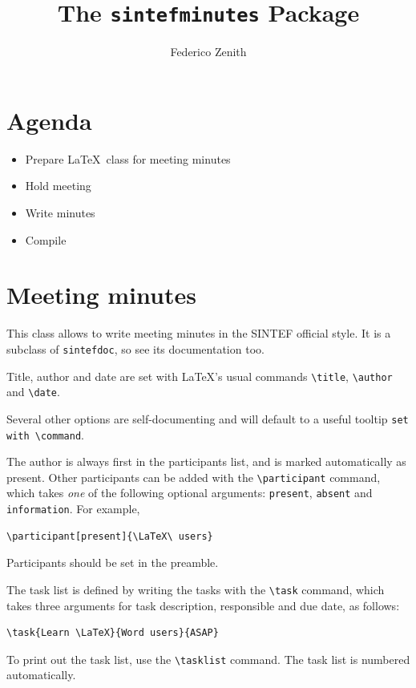 \documentclass[unrestricted]{sintefminutes}
\title{The \texttt{sintefminutes} Package}
\author{Federico Zenith}
\begin{document}
\frontmatter

\section*{Agenda}
\begin{itemize}
  \item Prepare \LaTeX\ class for meeting minutes
  \item Hold meeting
  \item Write minutes
  \item Compile
\end{itemize}

\section*{Meeting minutes}
This class allows to write meeting minutes in the SINTEF official style.
It is a subclass of \texttt{sintefdoc}, so see its documentation too.

Title, author and date are set with \LaTeX's usual commands
\verb|\title|, \verb|\author| and \verb|\date|.

Several other options are self-documenting and will default to a useful
tooltip \texttt{set with \textbackslash command}.

The author is always first in the participants list, and is marked automatically
as present.
Other participants can be added with the \verb|\participant| command, which
takes \emph{one} of the following optional arguments: \verb|present|, \verb|absent|
and \verb|information|.
For example,
\begin{verbatim}
\participant[present]{\LaTeX\ users}
\end{verbatim}
Participants should be set in the preamble.

The task list is defined by writing the tasks with the \verb|\task| command, which
takes three arguments for task description, responsible and due date, as
follows:
\begin{verbatim}
\task{Learn \LaTeX}{Word users}{ASAP}
\end{verbatim}
To print out the task list, use the \verb|\tasklist| command.
The task list is numbered automatically.

\tasklist
\end{document}
